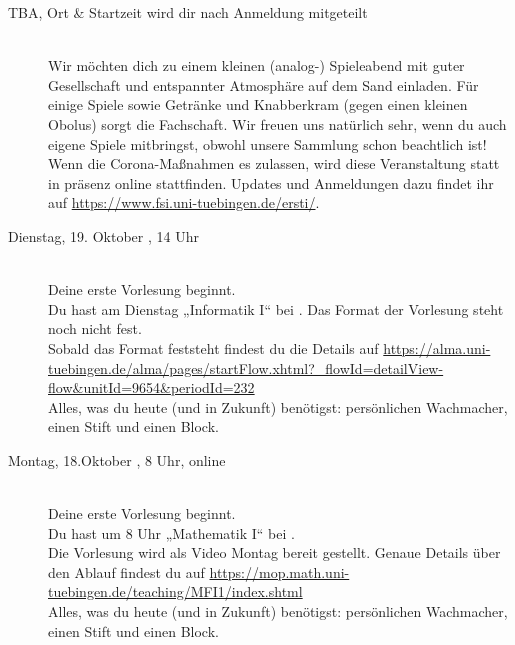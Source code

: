 \begin{description}
\else
    \item[TBA, \footnotesize{Ort \& Startzeit wird dir nach Anmeldung mitgeteilt}]\ \\
	Wir möchten dich zu einem kleinen (analog-) Spieleabend mit guter Gesellschaft und entspannter Atmosphäre auf dem Sand einladen. Für einige Spiele sowie Getränke und Knabberkram (gegen einen kleinen Obolus) sorgt die Fachschaft. Wir freuen uns natürlich sehr, wenn du auch eigene Spiele mitbringst, obwohl unsere Sammlung schon beachtlich ist! \\
	Wenn die Corona-Maßnahmen es zulassen, wird diese Veranstaltung statt in präsenz online stattfinden. Updates und Anmeldungen dazu findet ihr auf \url{https://www.fsi.uni-tuebingen.de/ersti/}.

\fi


\ifbachelor
	\iflehramt
		\item[Dienstag, 19. Oktober \YEAR, 14 Uhr]\ \\
		Deine erste Vorlesung beginnt. \\
		Du hast am Dienstag „Informatik I“ bei \Infoprof. Das Format der Vorlesung steht noch nicht fest.\\
		Sobald das Format feststeht findest du die Details auf \url{https://alma.uni-tuebingen.de/alma/pages/startFlow.xhtml?_flowId=detailView-flow&unitId=9654&periodId=232}\\
		Alles, was du heute (und in Zukunft) benötigst: persönlichen Wachmacher, einen Stift und einen Block. %
		
		\else
		\item[Montag, 18.Oktober \YEAR, 8 Uhr, online]\ \\
		Deine erste Vorlesung beginnt. \\
		Du hast um 8 Uhr „Mathematik I“ bei \Matheprof.\\
		Die Vorlesung wird als Video Montag bereit gestellt. Genaue Details über den Ablauf findest du auf \url{https://mop.math.uni-tuebingen.de/teaching/MFI1/index.shtml}\\
		Alles, was du heute (und in Zukunft) benötigst: persönlichen Wachmacher, einen Stift und einen Block. %
		

\end{description}
